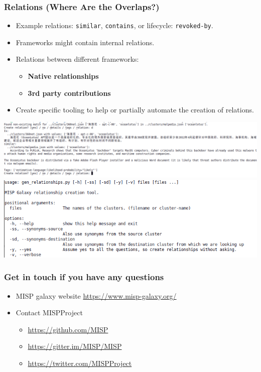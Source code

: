 \begin{frame}
        \frametitle{Relations (Where Are the Overlaps?)}
        \begin{itemize}
            \item Example relations: \texttt{similar}, \texttt{contains}, or lifecycle: \texttt{revoked-by}.
            \item Frameworks might contain internal relations.
            \item Relations between different frameworks:
            \begin{itemize}
                \item \textbf{Native relationships}
                \item \textbf{3rd party contributions}
            \end{itemize}
            \item Create specific tooling to help or partially automate the creation of relations.
        \end{itemize}
        \begin{center}
        \includegraphics[scale=0.2]{./screenshots/rel-gen-example.png}
        \includegraphics[scale=0.2]{./screenshots/rel-gen-help.png}
        \end{center}
\end{frame}


\begin{frame}
  \frametitle{Get in touch if you have any questions}
  \begin{itemize}
    \item MISP galaxy website \url{https://www.misp-galaxy.org/}
    \item Contact MISPProject 
    \begin{itemize}
      \item \url{https://github.com/MISP}
      \item \url{https://gitter.im/MISP/MISP}
      \item \url{https://twitter.com/MISPProject}
    \end{itemize}
  \end{itemize}
\end{frame}
